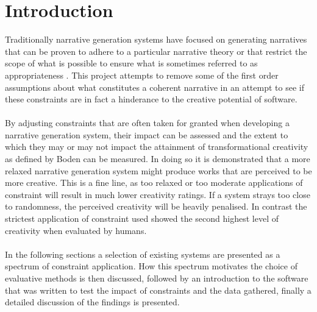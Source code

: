 \documentclass[letterpaper]{article}
\begin{document}
\section{Introduction}
Traditionally narrative generation systems have focused on generating narratives that can be proven to adhere to a particular narrative theory \cite{Perez2015}  or that restrict the scope of what is possible \cite{leon2008creative} to ensure what is sometimes referred to as appropriateness \cite{Sharples96anaccount}. This project attempts to remove some of the first order assumptions about what constitutes a coherent narrative in an attempt to see if these constraints are in fact a hinderance to the creative potential of software.\\ 
\\By adjusting constraints that are often taken for granted when developing a narrative generation system, their impact can be assessed and the extent to which they may or may not impact the attainment of transformational creativity as defined by Boden \cite{BODEN1998347} can be measured. In doing so it is demonstrated that a more relaxed narrative generation system might produce works that are perceived to be more creative. This is a fine line, as too relaxed or too moderate applications of constraint will result in much lower creativity ratings. If a system strays too close to randomness, the perceived creativity will be heavily penalised. In contrast the strictest application of constraint used showed the second highest level of creativity when evaluated by humans.\\
\\In the following sections a selection of existing systems are presented as a spectrum of constraint application. How this spectrum motivates the choice of evaluative methods is then discussed, followed by an introduction to the software that was written to test the impact of constraints and the data gathered, finally a detailed discussion of the findings is presented.

\end{document}
